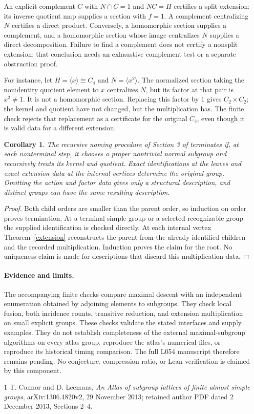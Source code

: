 \documentclass[11pt]{article}
\newtheorem{corollary}[theorem]{Corollary}
\begin{document}
An explicit complement $C$ with $N\cap C=1$ and $NC=H$ certifies a split
extension; its inverse quotient map supplies a section with $f=1$.
A complement centralizing $N$ certifies a direct product. Conversely, a
homomorphic section supplies a complement, and a homomorphic section whose
image centralizes $N$ supplies a direct decomposition. Failure to find a
complement does not certify a nonsplit extension: that conclusion needs
an exhaustive complement test or a separate obstruction proof.

For instance, let $H=\langle x\rangle\cong C_4$ and $N=\langle x^2\rangle$.
The normalized section taking the nonidentity quotient element to $x$
centralizes $N$, but its factor at that pair is $x^2\ne1$. It is not a
homomorphic section. Replacing this factor by $1$ gives $C_2\times C_2$;
the kernel and quotient have not changed, but the multiplication has.
The finite check rejects that replacement as a certificate for the original
$C_4$, even though it is valid data for a different extension.

\begin{corollary}
The recursive naming procedure of Section 3 of \cite{CL} terminates if,
at each nonterminal step, it chooses a proper nontrivial normal subgroup
and recursively treats its kernel and quotient. Exact identifications at
the leaves and exact extension data at the internal vertices determine the
original group. Omitting the action and factor data gives only a structural
description, and distinct groups can have the same resulting description.
\end{corollary}
\begin{proof}
Both child orders are smaller than the parent order, so induction on order
proves termination. At a terminal simple group or a selected recognizable
group the supplied identification is checked directly. At each internal
vertex Theorem~\ref{extension} reconstructs the parent from the already
identified children and the recorded multiplication. Induction proves the
claim for the root. No uniqueness claim is made for descriptions that
discard this multiplication data.
\end{proof}

\paragraph{Evidence and limits.}
The accompanying finite checks compare maximal descent with an independent
enumeration obtained by adjoining elements to subgroups. They check local
fusion, both incidence counts, transitive reduction, and extension
multiplication on small explicit groups. These checks validate the stated
interfaces and supply examples. They do not establish completeness of
the external maximal-subgroup algorithms on every atlas group, reproduce
the atlas's numerical files, or reproduce its historical timing comparison.
The full L054 manuscript therefore remains pending. No conjecture,
compression ratio, or Lean verification is claimed by this component.

\begin{thebibliography}{1}
 T. Connor and D. Leemans,
\emph{An Atlas of subgroup lattices of finite almost simple groups},
arXiv:1306.4820v2, 29 November 2013; retained author PDF dated
2 December 2013, Sections 2--4.
\end{thebibliography}
\end{document}
